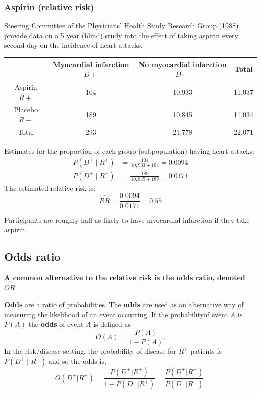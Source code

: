 \documentclass[a4paper]{article}
\begin{document}
\subsubsection{Aspirin (relative risk)}
Steering Committee of the Physicians' Health Study Research Group (1988) provide data on a 5 year (blind) study into the effect of taking aspirin every second day on the incidence of heart attacks.
\begin{table}[H]
	\centering
	\begin{tabular}{@{}cccc@{}}
	\toprule
		             & Myocardial infarction \( D+ \)  & No myocardial infarction \( D- \)  & Total \\ \midrule
	Aspirin \( R+ \) & 104	                           & 10,933                             & 11,037 \\
	Placebo \( R- \) & 189                             & 10,845                              & 11,034 \\
	Total            & 293                             & 21,778	                            & 22,071 \\ \bottomrule
	\end{tabular}
\end{table}
Estimates for the proportion of each group (subpopulation) having heart attacks:
\begin{align*}
	P(D^+ \mid R^+) & = \frac{104}{10,933 + 104} = 0.0094 \\
	P(D^+ \mid R^-) & = \frac{189}{10,845 + 189} = 0.0171
	\end{align*}
The estimated relative risk is: 
\[
	\widehat{RR} = \frac{0.0094}{0.0171} = 0.55
\]
\begin{tcolorbox}[bluestyleline]
	Participants are roughly half as likely to have myocardial infarction if they take aspirin.
\end{tcolorbox}
\subsection{Odds ratio}
\begin{goldbox}
	\textbf{A common alternative to the relative risk is the odds ratio, denoted} \( OR \) 
\end{goldbox}
\textbf{Odds} are a ratio of probabilities. The \textbf{odds} are used as an alternative way of measuring the likelihood of an event occurring.
If the probabilityof event \( A \) is \( P(A) \) the \textbf{odds} of event \( A \) is defined as
\[
O(A) = \frac{P(A)}{1-P(A)}.	
\]
In the risk/disease setting, the probability of disease for \( R^+ \) patients is \( P(D^+ \mid R^+) \) and so the odds is,
\[
	O(D^+|R^+) = \frac{P(D^+|R^+)}{1-P(D^+|R^+)}= \frac{P(D^+|R^+)}{P(D^-|R^+)}.
\]
\end{document}
